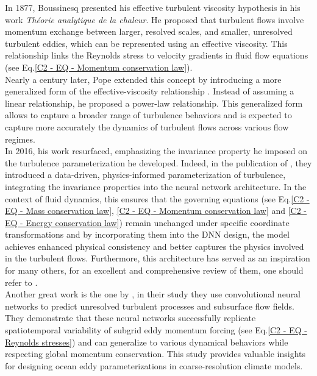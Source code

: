 In 1877, Boussinesq presented his effective turbulent viscosity hypothesis in his work \textit{Théorie analytique de la chaleur}. He proposed that turbulent flows involve momentum exchange between larger, resolved scales, and smaller, unresolved turbulent eddies, which can be represented using an effective viscosity. This relationship links the Reynolds stress to velocity gradients in fluid flow equations (see Eq.\ref{C2 - EQ - Momentum conservation law}).\\

Nearly a century later, Pope extended this concept by introducing a more generalized form of the effective-viscosity relationship \citep{EffectiveViscosity}. Instead of assuming a linear relationship, he proposed a power-law relationship. This generalized form allows to capture a broader range of turbulence behaviors and is expected to capture more accurately the dynamics of turbulent flows across various flow regimes.\\

In 2016, his work resurfaced, emphasizing the invariance property he imposed on the turbulence parameterization he developed. Indeed, in the publication of \cite{DNNInvariant1} , they introduced a data-driven, physics-informed parameterization of turbulence, integrating the invariance properties into the neural network architecture. In the context of fluid dynamics, this ensures that the governing equations (see Eq.\ref{C2 - EQ - Mass conservation law}, \ref{C2 - EQ - Momentum conservation law} and \ref{C2 - EQ - Energy conservation law}) remain unchanged under specific coordinate transformations and by incorporating them into the DNN design, the model achieves enhanced physical consistency and better captures the physics involved in the turbulent flows. Furthermore, this architecture has served as an inspiration for many others, for an excellent and comprehensive review of them, one should refer to \cite{DNNInvariant3}.\\

Another great work is the one by \cite{FCNN1}, in their study they use convolutional neural networks to predict unresolved turbulent processes and subsurface flow fields. They demonstrate that these neural networks successfully replicate spatiotemporal variability of subgrid eddy momentum forcing (see Eq.\ref{C2 - EQ - Reynolds stresses}) and can generalize to various dynamical behaviors while respecting global momentum conservation. This study provides valuable insights for designing ocean eddy parameterizations in coarse-resolution climate models.\\

